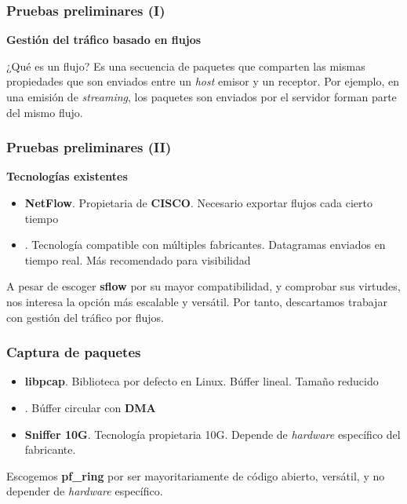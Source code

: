 \documentclass{beamer}
\begin{document}
\begin{frame}
\frametitle{Pruebas preliminares (I)}

\textbf{Gestión del tráfico basado en flujos}

\begin{block}{¿Qué es un flujo?}
	Es una secuencia de paquetes que comparten las mismas propiedades que son enviados entre un \textit{host} emisor y un receptor. Por ejemplo, en una emisión de \textit{streaming}, los paquetes son enviados por el servidor forman parte del mismo flujo. 
\end{block}

\end{frame}

\begin{frame}
\frametitle{Pruebas preliminares (II)}

\textbf{Tecnologías existentes}

\begin{itemize}
	\item \textbf{NetFlow}. Propietaria de \textbf{CISCO}. Necesario exportar flujos cada cierto tiempo
	\item \textbf{\color{purple}{sflow}}. Tecnología compatible con múltiples fabricantes. Datagramas enviados en tiempo real. Más recomendado para visibilidad
\end{itemize}

A pesar de escoger \textbf{sflow} por su mayor compatibilidad, y comprobar sus virtudes, nos interesa la opción más escalable y versátil. Por tanto, descartamos trabajar con gestión del tráfico por flujos.

\end{frame}


\begin{frame}
\frametitle{Captura de paquetes}

\begin{itemize}
	\item \textbf{libpcap}. Biblioteca por defecto en Linux. Búffer lineal. Tamaño reducido
	\item \textbf{\color{purple}{pf\_ring ZC}}. Búffer circular con \textbf{DMA}
	\item \textbf{Sniffer 10G}. Tecnología propietaria 10G. Depende de \textit{hardware} específico del fabricante.
\end{itemize}

Escogemos \textbf{pf\_ring} por ser mayoritariamente de código abierto, versátil, y no depender de \textit{hardware} específico.

\end{frame}
\end{document}
